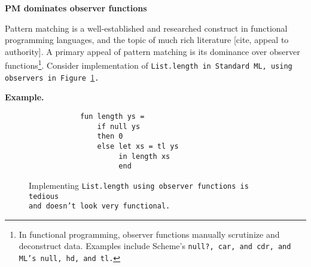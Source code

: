 \documentclass[manuscript,screen,review, 12pt]{acmart}
\begin{document}
    \begin{outline}[enumerate]
    \1 \bf{PM dominates observer functions} 
    
    Pattern matching is a well-established and researched construct in
    functional programming languages, and the topic of much rich literature
    [cite, appeal to authority]. A primary appeal of pattern matching is its
    dominance over observer functions\footnote{In functional programming,
    observer functions manually scrutinize and deconstruct data. Examples
    include Scheme's \tt{null?}, \tt{car}, and \tt{cdr}, and ML's \tt{null},
    \tt{hd}, and \tt{tl}.}. Consider implementation of \tt{List.length} in Standard
    ML, using observers in Figure~\ref{fig:observerlen}. 
    
    
    
    
    
    \2 \bf{Example. }

    \begin{figure}[ht!]
        \smllst
        \captionsetup{justification=centering}
        \begin{verbatim}
            fun length ys =
                if null ys 
                then 0 
                else let xs = tl ys 
                     in length xs 
                     end 
        \end{verbatim}
    \caption{Implementing \tt{List.length} using observer functions is tedious\\\hspace{\textwidth}
    and doesn't look very functional.}
    \label{fig:observerlen}
    \end{figure}
    

\end{outline}
\end{document}
